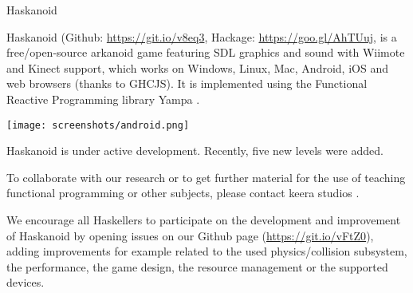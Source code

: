 \begin{hcarentry}[updated]{Haskanoid}
\label{haskanoid}
\makeheader

Haskanoid (Github: \href{https://git.io/v8eq3}{https://git.io/v8eq3}, Hackage:
\href{https://goo.gl/AhTUuj}{https://goo.gl/AhTUuj}, is a free/open-source
arkanoid game featuring SDL graphics and sound with Wiimote and Kinect support,
which works on Windows, Linux, Mac, Android, iOS and web browsers (thanks to
GHCJS). It is implemented using the Functional Reactive Programming library Yampa . 

\begin{center}
  \texttt{[image: screenshots/android.png]}
\end{center}





Haskanoid is under active development. Recently, five new levels were added.




To collaborate with our research or to get further material for the use of
teaching functional programming or other subjects, please contact keera studios
.

We encourage all Haskellers to participate on the development and improvement of
Haskanoid by opening issues on our Github page (\href{https://git.io/vFtZ0}{https://git.io/vFtZ0}),
adding improvements for example related to the used physics/collision subsystem,
the performance, the game design, the resource management or the supported devices. 

\end{hcarentry}
